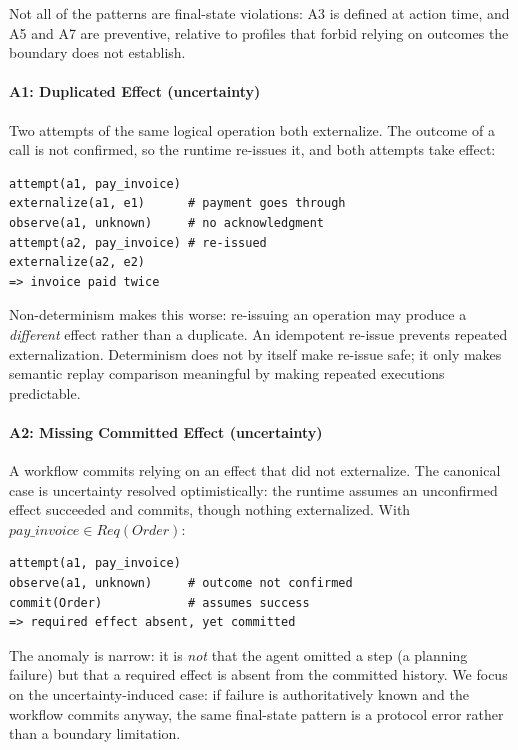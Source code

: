 \documentclass{article}
\begin{document}
Not all of the patterns are final-state violations: A3 is defined at
action time, and A5 and A7 are preventive, relative to profiles that forbid
relying on outcomes the boundary does not establish.

\paragraph{A1: Duplicated Effect (uncertainty)}
Two attempts of the same logical operation both externalize. The
outcome of a call is not confirmed, so the runtime re-issues it, and both
attempts take effect:
\par\vspace{2pt}\noindent\begin{minipage}{\linewidth}
\begingroup\footnotesize\begin{verbatim}
attempt(a1, pay_invoice)
externalize(a1, e1)      # payment goes through
observe(a1, unknown)     # no acknowledgment
attempt(a2, pay_invoice) # re-issued
externalize(a2, e2)
=> invoice paid twice
\end{verbatim}\endgroup
\end{minipage}\par\noindent
Non-determinism makes this worse: re-issuing an operation may produce a
\emph{different} effect rather than a duplicate. An idempotent re-issue
prevents repeated externalization. Determinism does not by itself make
re-issue safe; it only makes semantic replay comparison meaningful by
making repeated executions predictable.

\paragraph{A2: Missing Committed Effect (uncertainty)}
A workflow commits relying on an effect that did not externalize.
The canonical case is uncertainty resolved optimistically: the runtime
assumes an unconfirmed effect succeeded and commits, though nothing
externalized. With $pay\_invoice \in Req(Order)$:
\par\vspace{2pt}\noindent\begin{minipage}{\linewidth}
\begingroup\footnotesize\begin{verbatim}
attempt(a1, pay_invoice)
observe(a1, unknown)     # outcome not confirmed
commit(Order)            # assumes success
=> required effect absent, yet committed
\end{verbatim}\endgroup
\end{minipage}\par\noindent
The anomaly is narrow: it is \emph{not} that the agent omitted a step (a planning failure) but that a required effect is absent from the
committed history. We focus on the uncertainty-induced case: if failure is
authoritatively known and the workflow commits anyway, the same final-state
pattern is a protocol error rather than a boundary limitation.
\end{document}
